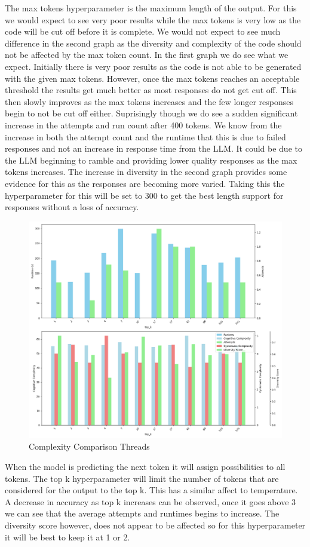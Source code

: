 \documentclass[12pt]{extarticle}
\begin{document}
The max tokens hyperparameter is the maximum length of the output. For this we would expect to see very poor results while the max tokens is very low as the code will be cut off before it is complete. We would not expect to see much difference in the second graph as the diversity and complexity of the code should not be affected by the max token count. In the first graph we do see what we expect. Initially there is very poor results as the code is not able to be generated with the given max tokens. However, once the max tokens reaches an acceptable threshold the results get much better as most responses do not get cut off. This then slowly improves as the max tokens increases and the few longer responses begin to not be cut off either. Suprisingly though we do see a sudden significant increase in the attempts and run count after 400 tokens. We know from the increase in both the attempt count and the runtime that this is due to failed responses and not an increase in response time from the LLM. It could be due to the LLM beginning to ramble and providing lower quality responses as the max tokens increases. The increase in diversity in the second graph provides some evidence for this as the responses are becoming more varied. Taking this the hyperparameter for this will be set to 300 to get the best length support for responses without a loss of accuracy.

\begin{figure}[h!]
\centering
\includegraphics[width=0.8\linewidth]{Images/Hyperparam_top_k_Comparison.png}
\caption{Complexity Comparison Threads}
\label{fig:Complexity_Comparison_Threads}
\end{figure}

When the model is predicting the next token it will assign possibilities to all tokens. The top k hyperparameter will limit the number of tokens that are considered for the output to the top k. This has a similar affect to temperature. A decrease in accuracy as top k increases can be observed, once it goes above 3 we can see that the average attempts and runtimes begins to increase. The diversity score however, does not appear to be affected so for this hyperparameter it will be best to keep it at 1 or 2.
\end{document}
